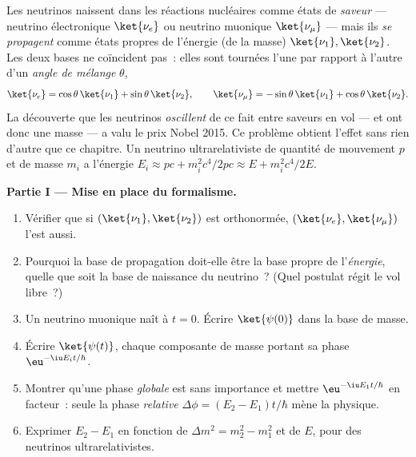 \begin{problem}\label{pb:b3:quantum-formalism:1}
Les neutrinos naissent dans les réactions nucléaires comme états de
\emph{saveur} --- neutrino électronique $\ket{\nu_e}$ ou neutrino
muonique $\ket{\nu_\mu}$ --- mais ils \emph{se propagent} comme états
propres de l'énergie (de la masse) $\ket{\nu_1},
\ket{\nu_2}$. Les deux bases ne coïncident pas~: elles sont tournées
l'une par rapport à l'autre d'un \emph{angle de mélange} $\theta$,
\[
\ket{\nu_e} = \cos\theta\,\ket{\nu_1} + \sin\theta\,\ket{\nu_2} ,
\qquad
\ket{\nu_\mu} = -\sin\theta\,\ket{\nu_1} + \cos\theta\,\ket{\nu_2} .
\]
La découverte que les neutrinos \emph{oscillent} de ce fait entre
saveurs en vol --- et ont donc une masse --- a valu le prix Nobel
2015. Ce problème obtient l'effet sans rien d'autre que ce chapitre.
Un neutrino ultrarelativiste de quantité de mouvement $p$ et de masse
$m_i$ a l'énergie $E_i \approx pc + m_i^2c^4/2pc \approx E +
m_i^2c^4/2E$.

\medskip\noindent\textbf{Partie I --- Mise en place du formalisme.}
\begin{enumerate}
  \item Vérifier que si $(\ket{\nu_1}, \ket{\nu_2})$ est orthonormée,
        $(\ket{\nu_e}, \ket{\nu_\mu})$ l'est aussi.
  \item Pourquoi la base de propagation doit-elle être la base propre
        de l'\emph{énergie}, quelle que soit la base de naissance du
        neutrino~? (Quel postulat régit le vol libre~?)
  \item Un neutrino muonique naît à $t = 0$. Écrire $\ket{\psi(0)}$
        dans la base de masse.
  \item Écrire $\ket{\psi(t)}$, chaque composante de masse portant sa
        phase $\eu^{-\iu E_it/\hbar}$.
  \item Montrer qu'une phase \emph{globale} est sans importance et
        mettre $\eu^{-\iu E_1t/\hbar}$ en facteur~: seule la phase
        \emph{relative} $\Delta\phi = (E_2 - E_1)t/\hbar$ mène la
        physique.
  \item Exprimer $E_2 - E_1$ en fonction de $\Delta m^2 = m_2^2 - m_1^2$
        et de $E$, pour des neutrinos ultrarelativistes.
\end{enumerate}


\end{problem}
